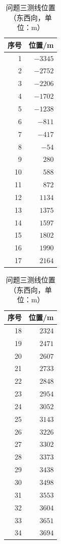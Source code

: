 \documentclass[12pt]{ctexart}
\begin{document}
\begin{table}[H]\centering
\caption{问题三测线位置（东西向，单位：m）}
\label{tab:p3}
\small
\begin{minipage}[t]{0.45\textwidth}\centering
\begin{tabular}{rr}
\toprule
序号 & 位置/m \\
\midrule
1 & $-3345$ \\ 2 & $-2752$ \\ 3 & $-2206$ \\ 4 & $-1702$ \\
5 & $-1238$ \\ 6 & $-811$ \\ 7 & $-417$ \\ 8 & $-54$ \\
9 & $280$ \\ 10 & $588$ \\ 11 & $872$ \\ 12 & $1134$ \\
13 & $1375$ \\ 14 & $1597$ \\ 15 & $1802$ \\ 16 & $1990$ \\
17 & $2164$ \\
\bottomrule
\end{tabular}
\end{minipage}\hfill
\begin{minipage}[t]{0.45\textwidth}\centering
\begin{tabular}{rr}
\toprule
序号 & 位置/m \\
\midrule
18 & $2324$ \\ 19 & $2471$ \\ 20 & $2607$ \\ 21 & $2733$ \\
22 & $2848$ \\ 23 & $2954$ \\ 24 & $3052$ \\ 25 & $3143$ \\
26 & $3226$ \\ 27 & $3302$ \\ 28 & $3373$ \\ 29 & $3438$ \\
30 & $3498$ \\ 31 & $3553$ \\ 32 & $3604$ \\ 33 & $3651$ \\
34 & $3694$ \\
\bottomrule
\end{tabular}
\end{minipage}
\end{table}
\end{document}
